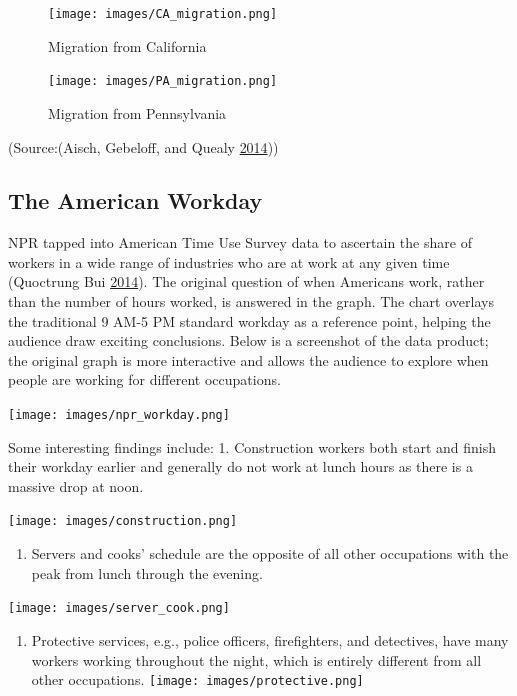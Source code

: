 \documentclass[]{book}
\providecommand{\tightlist}{%
  \setlength{\itemsep}{0pt}\setlength{\parskip}{0pt}}
\begin{document}
\begin{figure}
\centering
\texttt{[image: images/CA\_migration.png]}
\caption{Migration from California}
\end{figure}

\begin{figure}
\centering
\texttt{[image: images/PA\_migration.png]}
\caption{Migration from Pennsylvania}
\end{figure}

(Source:(Aisch, Gebeloff, and Quealy \protect\hyperlink{ref-migration}{2014}))

\hypertarget{the-american-workday}{%
\subsection{The American Workday}\label{the-american-workday}}

NPR tapped into American Time Use Survey data to ascertain the share of workers in a wide range of industries who are at work at any given time (Quoctrung Bui \protect\hyperlink{ref-NPR_workday}{2014}). The original question of when Americans work, rather than the number of hours worked, is answered in the graph. The chart overlays the traditional 9 AM-5 PM standard workday as a reference point, helping the audience draw exciting conclusions. Below is a screenshot of the data product; the original graph is more interactive and allows the audience to explore when people are working for different occupations.

\texttt{[image: images/npr\_workday.png]}

Some interesting findings include:
1. Construction workers both start and finish their workday earlier and generally do not work at lunch hours as there is a massive drop at noon.

\texttt{[image: images/construction.png]}

\begin{enumerate}
\def\labelenumi{\arabic{enumi}.}
\setcounter{enumi}{1}
\tightlist
\item
  Servers and cooks' schedule are the opposite of all other occupations with the peak from lunch through the evening.
\end{enumerate}

\texttt{[image: images/server\_cook.png]}

\begin{enumerate}
\def\labelenumi{\arabic{enumi}.}
\setcounter{enumi}{2}
\tightlist
\item
  Protective services, e.g., police officers, firefighters, and detectives, have many workers working throughout the night, which is entirely different from all other occupations.
  \texttt{[image: images/protective.png]}
\end{enumerate}
\end{document}

